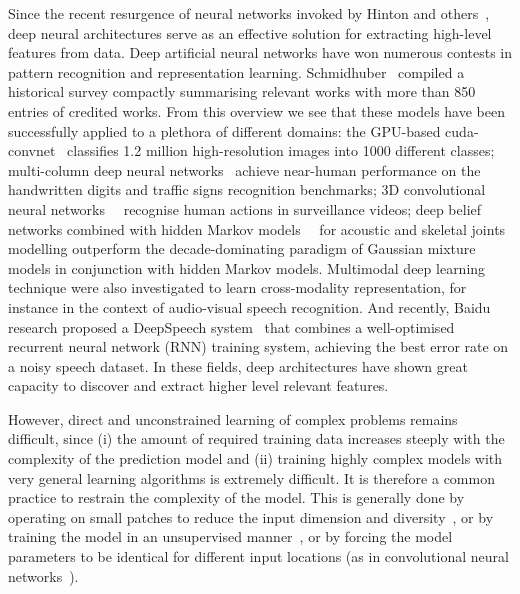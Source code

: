 Since the recent resurgence of neural networks invoked by Hinton and others~\cite{hinton2006fast},
deep neural architectures serve as an effective solution for extracting high-level features from data.
Deep artificial neural networks have won numerous contests in pattern recognition and representation learning.
Schmidhuber~\cite{schmidhuber2014deep} compiled a historical survey compactly summarising relevant works with more than 850 entries of credited works.
From this overview we see that these models have been successfully applied to a plethora of different domains: the GPU-based cuda-convnet~\cite{krizhevsky2012imagenet} classifies 1.2 million high-resolution images into 1000 different classes; multi-column deep neural networks~\cite{ciresan2012multi} achieve near-human performance on the handwritten digits and traffic signs recognition benchmarks; 3D convolutional neural networks~\cite{3dcnn}~\cite{ji20133d} recognise human actions in surveillance videos; deep belief networks combined with hidden Markov models~\cite{mohamed2012acoustic}~\cite{diwucvpr14} for acoustic and skeletal joints modelling outperform the decade-dominating paradigm of Gaussian mixture models in conjunction with hidden Markov models.
%
Multimodal deep learning technique were also investigated \cite{Ngiam2011multimodal} to learn cross-modality representation,
for instance in the context of audio-visual speech recognition.
%
And recently, Baidu research proposed a DeepSpeech system~\cite{hannun2014deepspeech} that combines a well-optimised recurrent neural network (RNN) training system, achieving the best error rate on a noisy speech dataset. In these fields, deep architectures have shown great capacity to discover and extract higher level relevant features.

However, direct and unconstrained learning of complex problems remains difficult, since (i) the amount of required training data increases steeply with the complexity of the prediction model and (ii) training highly complex models with very general learning algorithms is extremely difficult. It is therefore a common practice to restrain the complexity of the model. This is generally done by operating on small patches to reduce the input dimension and diversity~\cite{baccouche2005spatio}, or by training the model in an unsupervised manner~\cite{le2011learning}, or by forcing the model parameters to be identical for different input locations (as in convolutional neural networks~\cite{krizhevsky2012imagenet,ciresan2012multi,3dcnn}).



